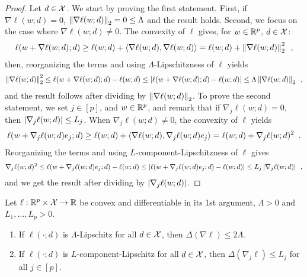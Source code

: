 \begin{proof}
  Let $d \in \mathcal X$.
  We start by proving the first statement.
  First, if $\nabla \ell(w;d) = 0$, $\left \lVert \nabla \ell(w;d) \right \rVert_2 = 0 \le \Lambda$ and
  the
  result holds.
  Second, we focus on the case where $\nabla \ell(w;d) \not= 0$.
  The convexity of $\ell$ gives, for $w \in \mathbb R^p$, $d \in \mathcal X$:
  \begin{align}
    \ell(w + \nabla \ell(w;d);d)
    \ge \ell(w;d) + \left\langle \nabla \ell(w;d), \nabla \ell(w;d) \right\rangle
    = \ell(w;d) + \left \lVert \nabla \ell(w;d) \right \rVert_2^2\enspace,
  \end{align}
  then, reorganizing the terms and using $\Lambda$-Lipschitzness of $\ell$
  yields
  \begin{align}
    \left \lVert \nabla \ell(w;d) \right \rVert_2^2
    \le \ell(w + \nabla \ell(w;d);d) - \ell(w;d)
    \le \left| \ell(w + \nabla \ell(w;d);d) - \ell(w;d) \right|
    \le \Lambda \left \lVert \nabla \ell(w;d) \right \rVert_2\enspace,
  \end{align}
  and the result follows after dividing by $\left \lVert \nabla \ell(w;d) \right \rVert_2$.
  To prove the second statement, we set $j \in [p]$, and $w \in \mathbb R^p$,
  and remark that if $\nabla_j \ell(w;d)=0$, then $\left| \nabla_j \ell(w;d) \right| \le
  L_j$.
  When $\nabla_j \ell(w;d) \neq 0$, the convexity of $\ell$ yields
  \begin{align}
    \ell(w + \nabla_j \ell(w;d) e_j;d)
    \ge \ell(w;d) + \left\langle \nabla \ell(w;d), \nabla_j \ell(w;d) e_j \right\rangle
    = \ell(w;d) + \nabla_j \ell(w;d)^2\enspace.
  \end{align}
  Reorganizing the terms and using $L$-component-Lipschitzness of $\ell$ gives
  \begin{align}
    \nabla_j \ell(w;d)^2
    \le \ell(w + \nabla_j \ell(w;d) e_j;d) - \ell(w;d)
    \le \left| \ell(w + \nabla_j \ell(w;d) e_j;d) - \ell(w;d) \right|
    \le L_j \left| \nabla_j\ell(w;d) \right|\enspace,
  \end{align}
  and we get the result after dividing by $\left| \nabla_j \ell(w;d) \right|$.
\end{proof}

\begin{lemma}
  \label{lemma:gradient-sensitivity-upper-bound}
  Let $\ell : \mathbb R^p \times \mathcal X \rightarrow \mathbb R$ be convex and differentiable
  in its 1st argument,
  $\Lambda > 0$ and $L_1, \dots, L_p > 0$.
  \begin{enumerate}
  \item If $\ell(\cdot; d)$ is $\Lambda$-Lipschitz for all $d \in \mathcal X$, then
    $\Delta(\nabla \ell) \le 2\Lambda$.
  \item If $\ell(\cdot; d)$ is $L$-component-Lipschitz for all $d \in \mathcal X$, then
    $\Delta(\nabla_j \ell) \le L_j$ for all $j \in [p]$.
  \end{enumerate}
\end{lemma}


